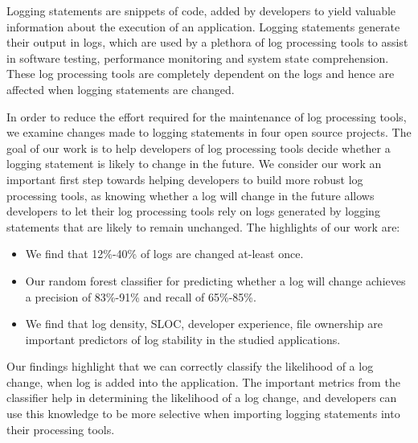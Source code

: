 Logging statements are snippets of code, added by developers to yield valuable information about the execution of an application. Logging statements generate their output in logs, which are used by a plethora of log processing tools to assist in software testing, performance monitoring and system state comprehension. These log processing tools are completely dependent on the logs and hence are affected when logging statements are changed.

In order to reduce the effort required for the maintenance of log processing tools, we examine changes made to logging statements in four open source projects. The goal of our work is to help developers of log processing tools decide whether a logging statement is likely to change in the future. We consider our work an important first step towards helping developers to build more robust log processing tools, as knowing whether a log will change in the future allows developers to let their log processing tools rely on logs generated by logging statements that are likely to remain unchanged. The highlights of our work are:


\begin{itemize}
	\item We find that 12\%-40\%  of logs are changed at-least once.
	\item Our random forest classifier for predicting whether a log will change achieves a precision of 83\%-91\% and recall of 65\%-85\%. 
	\item We find that log density, SLOC, developer experience, file ownership are important predictors of log stability in the studied applications.  	
	
\end{itemize}

Our findings highlight that we can correctly classify the likelihood of a log change, when log is added into the application. The important metrics from the classifier help in determining the likelihood of a log change, and developers can use this knowledge to be more selective when importing logging statements into their processing tools. 




